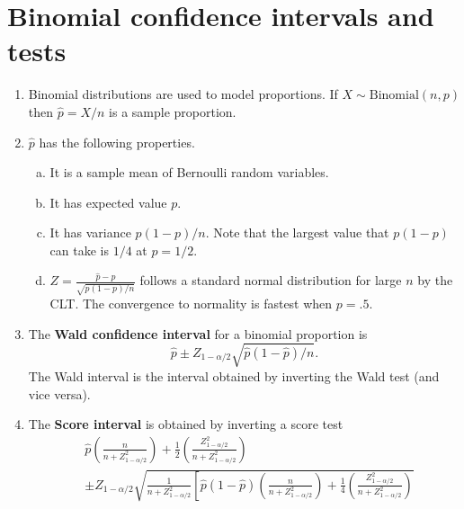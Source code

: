 \documentclass[12pt]{article}
\begin{document}
\section{Binomial confidence intervals and tests}
\begin{enumerate}[1.]
\item Binomial distributions are used to model proportions. If
  $X \sim \mathrm{Binomial}(n,p)$ then $\hat p = X / n$ is a sample
  proportion.
\item $\hat p$ has the following properties.
  \begin{enumerate}[a.]
  \item It is a sample mean of Bernoulli random variables.
  \item It has expected value $p$.
  \item It has variance $p (1 - p) / n$. Note that the largest value that $p (1 - p)$ can 
    take is $1/4$ at $p = 1/2$.
  \item $Z = \frac{\hat p - p}{\sqrt{p (1 - p) / n}}$ follows a standard normal distribution
    for large $n$ by the CLT. The convergence to normality is fastest when $p = .5$.
  \end{enumerate}
\item The {\bf Wald confidence interval} for a binomial proportion is
  $$
  \hat p \pm Z_{1 - \alpha / 2} \sqrt{\hat p (1 - \hat p) / n}.
  $$
  The Wald interval is the interval obtained by inverting the Wald test (and vice versa).
\item The {\bf Score interval} is obtained by inverting a score test 
\begin{eqnarray*}
&  \hat p \left(\frac{n}{n + Z_{1 - \alpha / 2}^2}\right) + 
  \frac{1}{2} \left(\frac{Z_{1 - \alpha / 2}^2}{n + Z_{1 - \alpha / 2}^2}\right) \\
&  \pm Z_{1 - \alpha/2}\sqrt{\frac{1}{n + Z_{1 - \alpha / 2}^2} 
  \left[\hat p (1 - \hat p) \left(\frac{n}{n + Z_{1 - \alpha / 2}^2}\right) +
    \frac{1}{4} \left(\frac{Z_{1 - \alpha / 2}^2}{n + Z_{1 - \alpha / 2}^2}\right)
}
\end{eqnarray*}
\end{enumerate}
\end{document}

